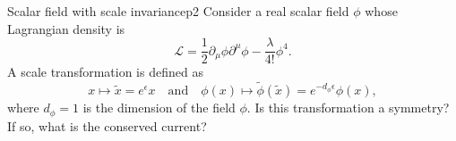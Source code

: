\begin{problem}{Scalar field with scale invariance}{p2}
   Consider a real scalar field \(\phi\) whose Lagrangian density is
   \begin{equation*}
      \mathcal{L} = \frac12 \partial_\mu \phi \partial^\mu \phi - \frac{\lambda}{4!}\phi^4.
   \end{equation*}
   A scale transformation is defined as 
   \begin{equation*}
      x \mapsto \tilde{x} = e^{\epsilon} x
      \quad\text{and}\quad
      \phi(x) \mapsto \tilde{\phi}(\tilde{x}) = e^{-d_\phi \epsilon}\phi(x),
   \end{equation*}
   where \(d_\phi = 1\) is the dimension of the field \(\phi\). Is this transformation a symmetry? If so, what is the conserved current?
\end{problem}
